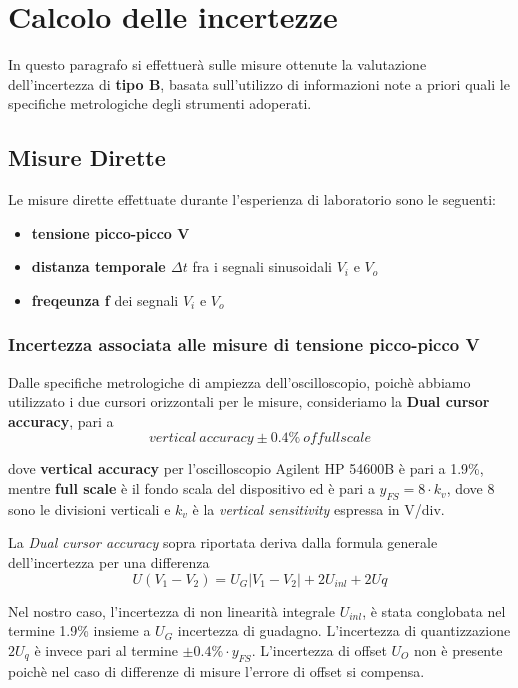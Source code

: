 
\clearpage
\section{Calcolo delle incertezze}
In questo paragrafo si effettuerà sulle misure ottenute la valutazione dell'incertezza di \textbf{tipo B}, basata sull'utilizzo di informazioni note a priori quali le specifiche metrologiche degli strumenti adoperati.

\subsection{Misure Dirette}
Le misure dirette effettuate durante l'esperienza di laboratorio sono le seguenti:
\begin{itemize}
    \item \textbf{tensione picco-picco V}
    \item \textbf{distanza temporale $\Delta t$}  fra i segnali sinusoidali $V_i$ e $V_o$
    \item \textbf{freqeunza f} dei segnali $V_i$ e $V_o$ 
\end{itemize}

\subsubsection{Incertezza associata alle misure di tensione picco-picco V}
Dalle specifiche metrologiche di ampiezza dell'oscilloscopio, poichè abbiamo utilizzato i due cursori orizzontali per le misure, consideriamo la \textbf{Dual cursor accuracy}, pari a 
\[vertical \ accuracy \pm 0.4\% \ of full scale\]

dove \textbf{vertical accuracy} per l'oscilloscopio Agilent HP 54600B è pari a 1.9\%, mentre \textbf{full scale} è il fondo scala del dispositivo ed è pari a $y_{FS} = 8 \cdot k_v$, dove 8 sono le divisioni verticali e $k_v$ è la \emph{vertical sensitivity} espressa in V/div.

La \emph{Dual cursor accuracy} sopra riportata deriva dalla formula generale dell'incertezza per una differenza 
\[U(V_1 - V_2) = U_G|V_1 - V_2| + 2U_{inl} + 2U{q}\]

Nel nostro caso, l'incertezza di non linearità integrale $U_{inl}$, è stata conglobata nel termine 1.9\% insieme a $U_G$ incertezza di guadagno. L'incertezza di quantizzazione $2U_q$ è invece pari al termine $\pm 0.4\% \cdot y_{FS}$. L'incertezza di offset $U_O$ non è presente poichè nel caso di differenze di misure l'errore di offset si compensa.

